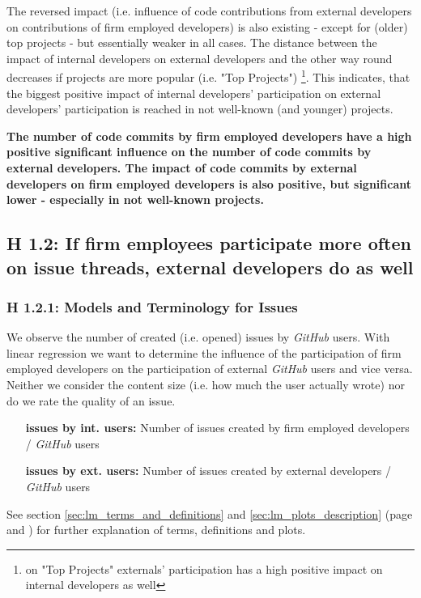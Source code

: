 The reversed impact (i.e. influence of code contributions from external developers on contributions of firm employed developers) is also existing - except for (older) top projects - but essentially weaker in all cases. The distance between the impact of internal developers on external developers and the other way round decreases if projects are more popular (i.e. "Top Projects") \footnote{on "Top Projects" externals' participation has a high positive impact on internal developers as well}. This indicates, that the biggest positive impact of internal developers' participation on external developers' participation is reached in not well-known (and younger) projects.

\textbf{The number of code commits by firm employed developers have a high positive significant influence on the number of code commits by external developers. The impact of code commits by external developers on firm employed developers is also positive, but significant lower - especially in not well-known projects.}

\newpage

\subsection{H 1.2: If firm employees participate more often on issue threads, external developers do as well}

\subsubsection{H 1.2.1: Models and Terminology for Issues}

We observe the number of created (i.e. opened) issues by \textit{GitHub} users. With linear regression we want to determine the influence of the participation of firm employed developers on the participation of external \textit{GitHub} users and vice versa. Neither we consider the content size (i.e. how much the user actually wrote) nor do we rate the quality of an issue.

\begin{itemize}
	\item [\textbf{issues by int. users:}] Number of issues created by firm employed developers / \textit{GitHub} users
	\item [\textbf{issues by ext. users:}] Number of issues created by external developers / \textit{GitHub} users
\end{itemize}

See section \ref{sec:lm_terms_and_definitions} and \ref{sec:lm_plots_description} (page \pageref{sec:lm_terms_and_definitions} and \pageref{sec:lm_plots_description}) for further explanation of terms, definitions and plots.

